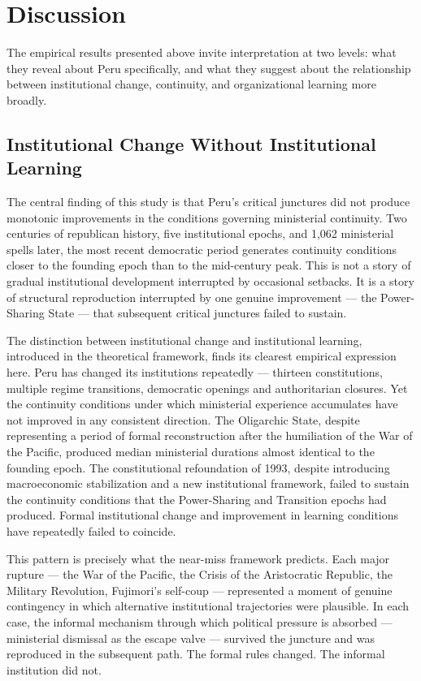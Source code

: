 \documentclass[doc, 12pt, a4paper,floatsintext]{apa7}
\begin{document}
\section{Discussion}

The empirical results presented above invite interpretation at two 
levels: what they reveal about Peru specifically, and what they 
suggest about the relationship between institutional change, 
continuity, and organizational learning more broadly.

\subsection{Institutional Change Without Institutional Learning}

The central finding of this study is that Peru's critical junctures 
did not produce monotonic improvements in the conditions governing 
ministerial continuity. Two centuries of republican history, five 
institutional epochs, and 1,062 ministerial spells later, the most 
recent democratic period generates continuity conditions closer to 
the founding epoch than to the mid-century peak. This is not a 
story of gradual institutional development interrupted by occasional 
setbacks. It is a story of structural reproduction interrupted by 
one genuine improvement --- the Power-Sharing State --- that 
subsequent critical junctures failed to sustain.

The distinction between institutional change and institutional 
learning, introduced in the theoretical framework, finds its 
clearest empirical expression here. Peru has changed its 
institutions repeatedly --- thirteen constitutions, multiple regime 
transitions, democratic openings and authoritarian closures. Yet 
the continuity conditions under which ministerial experience 
accumulates have not improved in any consistent direction. The 
Oligarchic State, despite representing a period of formal 
reconstruction after the humiliation of the War of the Pacific, 
produced median ministerial durations almost identical to the 
founding epoch. The constitutional refoundation of 1993, despite 
introducing macroeconomic stabilization and a new institutional 
framework, failed to sustain the continuity conditions that the 
Power-Sharing and Transition epochs had produced. Formal 
institutional change and improvement in learning conditions have 
repeatedly failed to coincide.

This pattern is precisely what the near-miss framework predicts. 
Each major rupture --- the War of the Pacific, the Crisis of the 
Aristocratic Republic, the Military Revolution, Fujimori's 
self-coup --- represented a moment of genuine contingency in which 
alternative institutional trajectories were plausible. In each 
case, the informal mechanism through which political pressure is 
absorbed --- ministerial dismissal as the escape valve --- survived 
the juncture and was reproduced in the subsequent path. The 
formal rules changed. The informal institution did not.
\end{document}
